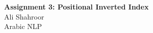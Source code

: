 \documentclass[10pt,a4paper]{article}
\begin{document}
\begin{center}
{\LARGE\bfseries\color{heading} Assignment 3: Positional Inverted Index}\\[5pt]
{\large Ali Shahroor}\\[2pt]
Arabic NLP
\end{center}

\end{document}
